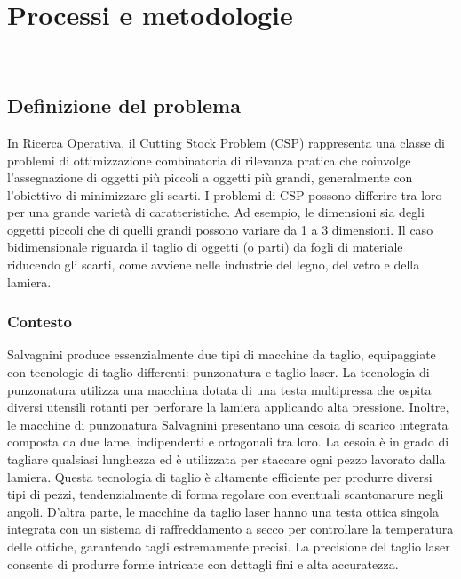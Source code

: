 \chapter{Processi e metodologie}
\label{cap:processi-metodologie}

\\

\section{Definizione del problema}

In Ricerca Operativa, il Cutting Stock Problem (CSP) rappresenta una classe di problemi di ottimizzazione combinatoria di rilevanza pratica che coinvolge l'assegnazione di oggetti più piccoli a oggetti più grandi, generalmente con l'obiettivo di minimizzare gli scarti. I problemi di CSP possono differire tra loro per una grande varietà di caratteristiche. Ad esempio, le dimensioni sia degli oggetti piccoli che di quelli grandi possono variare da 1 a 3 dimensioni. Il caso bidimensionale riguarda il taglio di oggetti (o parti) da fogli di materiale riducendo gli scarti, come avviene nelle industrie del legno, del vetro e della lamiera.

\subsection{Contesto}

Salvagnini produce essenzialmente due tipi di macchine da taglio, equipaggiate con tecnologie di taglio differenti: punzonatura e taglio laser. La tecnologia di punzonatura utilizza una macchina dotata di una testa multipressa che ospita diversi utensili rotanti per perforare la lamiera applicando alta pressione. Inoltre, le macchine di punzonatura Salvagnini presentano una cesoia di scarico integrata composta da due lame, indipendenti e ortogonali tra loro. La cesoia è in grado di tagliare qualsiasi lunghezza ed è utilizzata per staccare ogni pezzo lavorato dalla lamiera. Questa tecnologia di taglio è altamente efficiente per produrre diversi tipi di pezzi, tendenzialmente di forma regolare con eventuali scantonarure negli angoli. D'altra parte, le macchine da taglio laser hanno una testa ottica singola integrata con un sistema di raffreddamento a secco per controllare la temperatura delle ottiche, garantendo tagli estremamente precisi. La precisione del taglio laser consente di produrre forme intricate con dettagli fini e alta accuratezza.

